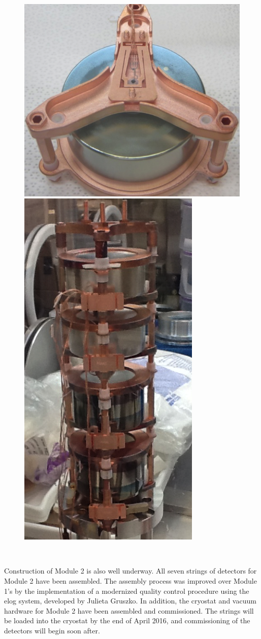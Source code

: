 \begin{figure}[h]
\hfil  \includegraphics[width=.60\textwidth]{MJD_detectorUnit.png} \hfil 
\hfil  \includegraphics[width=.30\textwidth]{MJD_string.png} \hfil

~


\label{MJD_Assemblies}  %

\end{figure}


Construction of Module 2 is also well underway. All seven strings of detectors for Module 2 have been assembled. The assembly process was improved over Module 1's by the implementation of a modernized quality control procedure using the elog system, developed by Julieta Gruszko. In addition, the cryostat and vacuum hardware for Module 2 have been assembled and commissioned. The strings will be loaded into the cryostat by the end of April 2016, and commissioning of the detectors will begin soon after.

